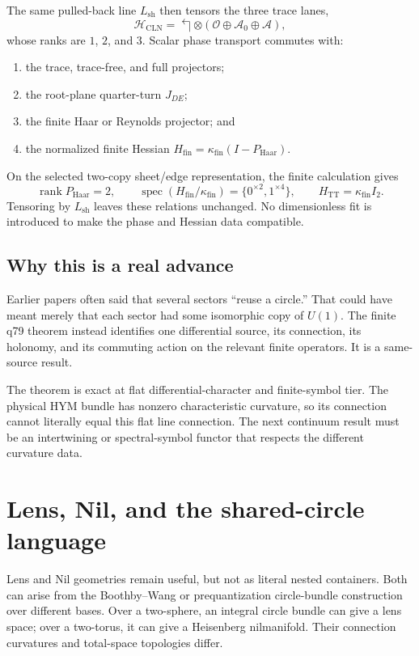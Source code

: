 \documentclass[11pt]{article}
\newcommand{\MTTSharedLine}{L_{\mathrm{sh}}}
\newcommand{\MTTCLNSpace}{\mathcal H_{\mathrm{CLN}}}
\begin{document}
The same pulled-back line \(\MTTSharedLine\) then tensors the three trace lanes,
\[
 \MTTCLNSpace
 =
 \Lsh\otimes
 \left(
  \mathcal O\oplus\mathcal A_0\oplus\mathcal A
 \right),
\]
whose ranks are \(1\), \(2\), and \(3\). Scalar phase transport commutes with:
\begin{enumerate}
\item the trace, trace-free, and full projectors;
\item the root-plane quarter-turn \(J_{DE}\);
\item the finite Haar or Reynolds projector; and
\item the normalized finite Hessian
  \(H_{\mathrm{fin}}=\kappa_{\mathrm{fin}}(I-P_{\mathrm{Haar}})\).
\end{enumerate}

On the selected two-copy sheet/edge representation, the finite calculation
gives
\[
 \operatorname{rank}P_{\mathrm{Haar}}=2,
 \qquad
 \operatorname{spec}(H_{\mathrm{fin}}/\kappa_{\mathrm{fin}})
 =\{0^{\times2},1^{\times4}\},
 \qquad
 H_{\mathrm{TT}}=\kappa_{\mathrm{fin}}I_2.
\]
Tensoring by \(\MTTSharedLine\) leaves these relations unchanged. No dimensionless fit
is introduced to make the phase and Hessian data compatible.

\subsection{Why this is a real advance}

Earlier papers often said that several sectors ``reuse a circle.'' That could
have meant merely that each sector had some isomorphic copy of \(U(1)\). The
finite q79 theorem instead identifies one differential source, its
connection, its holonomy, and its commuting action on the relevant finite
operators. It is a same-source result.

The theorem is exact at flat differential-character and finite-symbol tier.
The physical HYM bundle has nonzero characteristic curvature, so its
connection cannot literally equal this flat line connection. The next
continuum result must be an intertwining or spectral-symbol functor that
respects the different curvature data.

\section{Lens, Nil, and the shared-circle language}

Lens and Nil geometries remain useful, but not as literal nested containers.
Both can arise from the Boothby--Wang or prequantization circle-bundle
construction over different bases. Over a two-sphere, an integral circle
bundle can give a lens space; over a two-torus, it can give a Heisenberg
nilmanifold. Their connection curvatures and total-space topologies differ.
\end{document}
